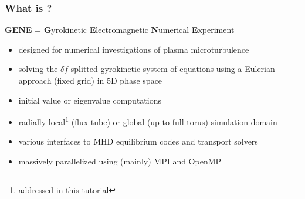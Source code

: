 \documentclass[9pt]{beamer}
\begin{document}
\begin{frame}
  \frametitle{What is \gene?}

\begin{block}{{\sc \bf GENE} = {\bf G}yrokinetic {\bf E}lectromagnetic {\bf N}umerical {\bf E}xperiment}
\vspace{2ex}
 \begin{itemize}
  \item designed for numerical investigations of plasma microturbulence\\[2ex]
  \item solving the $\delta f$-splitted gyrokinetic system of equations using a Eulerian approach (fixed grid)
in 5D phase space\\[2ex]
  \item initial value or eigenvalue computations\\[2ex]
  \item radially local\footnote{addressed in this tutorial} (flux tube) or global (up to full torus) simulation domain\\[2ex]
  \item various interfaces to MHD equilibrium codes and transport solvers\\[2ex]
  \item massively parallelized using (mainly) MPI and OpenMP\\[2ex]
 \end{itemize}

\end{block}


\end{frame}

\end{document}
